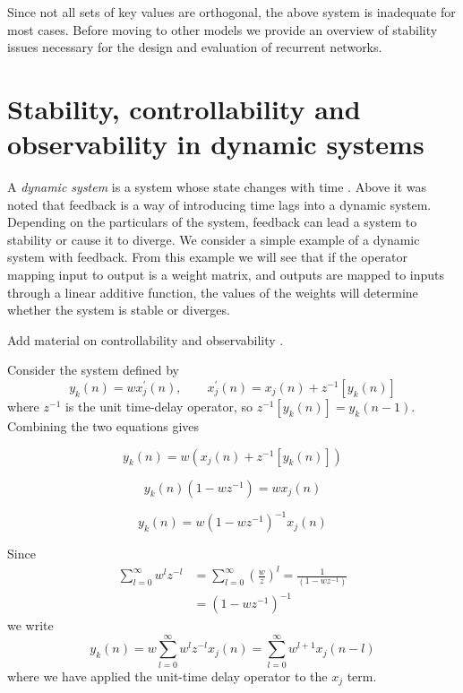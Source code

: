 Since not all sets of key values are orthogonal, the above system is inadequate for most cases. Before moving to other models we provide an overview of stability issues necessary for the design and evaluation of recurrent networks.

\section{Stability, controllability and observability in dynamic systems}

A \emph{dynamic system} is a system whose state changes with time \cite[p. 675]{Haykin:2009:NNC:1213811}. Above it was noted that feedback is a way of introducing time lags into a dynamic system. Depending on the particulars of the system, feedback can lead a system to stability or cause it to diverge. We consider a simple example \cite[p. 18-21]{Haykin:2009:NNC:1213811} of a dynamic system with feedback. From this example we will see that if the operator mapping input to output is a weight matrix, and outputs are mapped to inputs through a linear additive function, the values of the weights will determine whether the system is stable or diverges.

Add material on controllability and observability \cite{klamka2008controllability}.

Consider the system defined by
%
\begin{equation*}
y_k(n) = wx_j^\prime(n), \qquad x_j^\prime(n) = x_j(n) + z^{-1}[y_k(n)]
\end{equation*}
%
where $z^{-1}$ is the unit time-delay operator, so $z^{-1}[y_k(n)] = y_k(n-1)$. Combining the two equations gives

\begin{equation*}
  y_k(n) = w \left(x_j(n) + z^{-1}[y_k(n)]\right)
\end{equation*}

\begin{equation*}
  y_k(n)(1 - wz^{-1}) = wx_j(n)
\end{equation*}

\begin{equation*}
  y_k(n) = w(1 - wz^{-1})^{-1}x_j(n)
\end{equation*}

Since
%
\begin{align*}
  \sum_{l=0}^{\infty}w^l z^{-l} & = \sum_{l=0}^{\infty}\left(\frac{w}{z}\right)^l = \frac{1}{(1 - wz^{-1})} \\
  & = (1 - wz^{-1})^{-1}
\end{align*}
%
we write
%
\begin{equation*}
  y_k(n) = w \sum_{l=0}^{\infty}w^l z^{-l}x_j(n) = \sum_{l=0}^{\infty}w^{l+1}x_j(n - l)
\end{equation*}
%
where we have applied the unit-time delay operator to the $x_j$ term.


